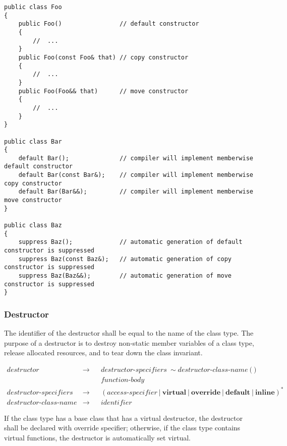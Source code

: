 \documentclass[a4paper,oneside,11pt]{article}
\begin{document}
\clearpage
\begin{lstlisting}[frame=trBL]
public class Foo
{
    public Foo()                // default constructor
    {
        //  ...
    }
    public Foo(const Foo& that) // copy constructor
    {
        //  ...
    }
    public Foo(Foo&& that)      // move constructor
    {
        //  ...
    }
}

public class Bar
{
    default Bar();              // compiler will implement memberwise default constructor
    default Bar(const Bar&);    // compiler will implement memberwise copy constructor
    default Bar(Bar&&);         // compiler will implement memberwise move constructor
}

public class Baz
{
    suppress Baz();             // automatic generation of default constructor is suppressed
    suppress Baz(const Baz&);   // automatic generation of copy constructor is suppressed
    suppress Baz(Baz&&);        // automatic generation of move constructor is suppressed
}
\end{lstlisting}

\subsubsection{Destructor}\label{destructor}

The identifier of the destructor shall be equal to the name of the class type.
The purpose of a destructor is to destroy non-static member variables of a class type, release allocated resources,
and to tear down the class invariant.

\begin{align*}
destructor &\rightarrow & &destructor\textrm{-}specifiers \> \sim{}destructor\textrm{-}class\textrm{-}name \> \texttt{(} \> \texttt{)}\\
& & &\hyperref[functionbody]{function\textrm{-}body}\\
destructor\textrm{-}specifiers &\rightarrow & &(\hyperref[accessspecifier]{access\textrm{-}specifier} \> | \> \textbf{virtual} \> | \>
\textbf{override} \> | \> \textbf{default} \> | \> \textbf{inline})^*\\
destructor\textrm{-}class\textrm{-}name &\rightarrow & &\hyperref[identifier]{identifier}
\end{align*}

If the class type has a base class that has a virtual destructor, the destructor shall be declared with override specifier;
otherwise, if the class type contains virtual functions, the destructor is automatically set virtual.
\end{document}
